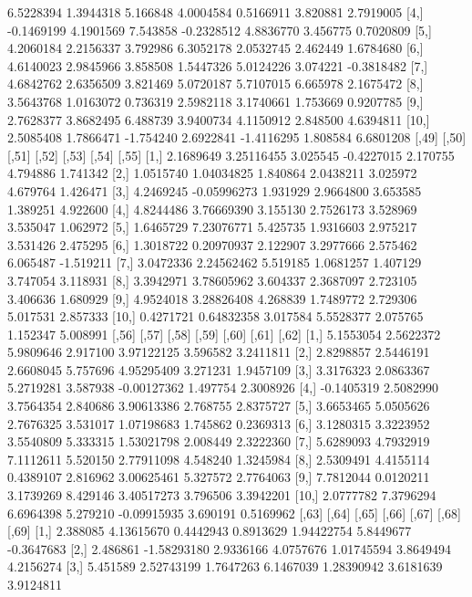 \documentclass[12pt]{article}
\begin{document}
\begin{Schunk}
\begin{Soutput}
 [3,]  6.5228394 1.3944318  5.166848  4.0004584  0.5166911 3.820881  2.7919005
 [4,] -0.1469199 4.1901569  7.543858 -0.2328512  4.8836770 3.456775  0.7020809
 [5,]  4.2060184 2.2156337  3.792986  6.3052178  2.0532745 2.462449  1.6784680
 [6,]  4.6140023 2.9845966  3.858508  1.5447326  5.0124226 3.074221 -0.3818482
 [7,]  4.6842762 2.6356509  3.821469  5.0720187  5.7107015 6.665978  2.1675472
 [8,]  3.5643768 1.0163072  0.736319  2.5982118  3.1740661 1.753669  0.9207785
 [9,]  2.7628377 3.8682495  6.488739  3.9400734  4.1150912 2.848500  4.6394811
[10,]  2.5085408 1.7866471 -1.754240  2.6922841 -1.4116295 1.808584  6.6801208
          [,49]       [,50]    [,51]      [,52]    [,53]    [,54]     [,55]
 [1,] 2.1689649  3.25116455 3.025545 -0.4227015 2.170755 4.794886  1.741342
 [2,] 1.0515740  1.04034825 1.840864  2.0438211 3.025972 4.679764  1.426471
 [3,] 4.2469245 -0.05996273 1.931929  2.9664800 3.653585 1.389251  4.922600
 [4,] 4.8244486  3.76669390 3.155130  2.7526173 3.528969 3.535047  1.062972
 [5,] 1.6465729  7.23076771 5.425735  1.9316603 2.975217 3.531426  2.475295
 [6,] 1.3018722  0.20970937 2.122907  3.2977666 2.575462 6.065487 -1.519211
 [7,] 3.0472336  2.24562462 5.519185  1.0681257 1.407129 3.747054  3.118931
 [8,] 3.3942971  3.78605962 3.604337  2.3687097 2.723105 3.406636  1.680929
 [9,] 4.9524018  3.28826408 4.268839  1.7489772 2.729306 5.017531  2.857333
[10,] 0.4271721  0.64832358 3.017584  5.5528377 2.075765 1.152347  5.008991
           [,56]     [,57]     [,58]    [,59]       [,60]    [,61]     [,62]
 [1,]  5.1553054 2.5622372 5.9809646 2.917100  3.97122125 3.596582 3.2411811
 [2,]  2.8298857 2.5446191 2.6608045 5.757696  4.95295409 3.271231 1.9457109
 [3,]  3.3176323 2.0863367 5.2719281 3.587938 -0.00127362 1.497754 2.3008926
 [4,] -0.1405319 2.5082990 3.7564354 2.840686  3.90613386 2.768755 2.8375727
 [5,]  3.6653465 5.0505626 2.7676325 3.531017  1.07198683 1.745862 0.2369313
 [6,]  3.1280315 3.3223952 3.5540809 5.333315  1.53021798 2.008449 2.3222360
 [7,]  5.6289093 4.7932919 7.1112611 5.520150  2.77911098 4.548240 1.3245984
 [8,]  2.5309491 4.4155114 0.4389107 2.816962  3.00625461 5.327572 2.7764063
 [9,]  7.7812044 0.0120211 3.1739269 8.429146  3.40517273 3.796506 3.3942201
[10,]  2.0777782 7.3796294 6.6964398 5.279210 -0.09915935 3.690191 0.5169962
         [,63]       [,64]     [,65]     [,66]      [,67]     [,68]      [,69]
 [1,] 2.388085  4.13615670 0.4442943 0.8913629 1.94422754 5.8449677 -0.3647683
 [2,] 2.486861 -1.58293180 2.9336166 4.0757676 1.01745594 3.8649494  4.2156274
 [3,] 5.451589  2.52743199 1.7647263 6.1467039 1.28390942 3.6181639  3.9124811

\end{Soutput}
\end{Schunk}
\end{document}
